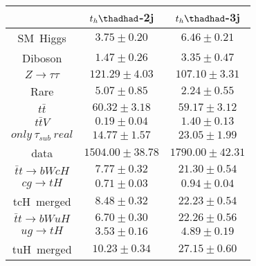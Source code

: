 \centering
\begin{tabular}{|c|c|c|} \hline
 & $t_{h}\thadhad$-2j & $t_{h}\thadhad$-3j\\\hline
SM~Higgs & $3.75\pm0.20$ & $6.46\pm0.21$\\\hline
Diboson & $1.47\pm0.26$ & $3.35\pm0.47$\\\hline
$Z\to\tau\tau$ & $121.29\pm4.03$ & $107.10\pm3.31$\\\hline
Rare & $5.07\pm0.85$ & $2.24\pm0.55$\\\hline
$t\bar{t}$ & $60.32\pm3.18$ & $59.17\pm3.12$\\\hline
$t\bar{t}V$ & $0.19\pm0.04$ & $1.40\pm0.13$\\\hline
$only~\tau_{sub}~real$ & $14.77\pm1.57$ & $23.05\pm1.99$\\\hline
data & $1504.00\pm38.78$ & $1790.00\pm42.31$\\\hline
$\bar{t}t\to bWcH$ & $7.77\pm0.32$ & $21.30\pm0.54$\\\hline
$cg\to tH$ & $0.71\pm0.03$ & $0.94\pm0.04$\\\hline
tcH~merged & $8.48\pm0.32$ & $22.23\pm0.54$\\\hline
$\bar{t}t\to bWuH$ & $6.70\pm0.30$ & $22.26\pm0.56$\\\hline
$ug\to tH$ & $3.53\pm0.16$ & $4.89\pm0.19$\\\hline
tuH~merged & $10.23\pm0.34$ & $27.15\pm0.60$\\\hline
\end{tabular}
